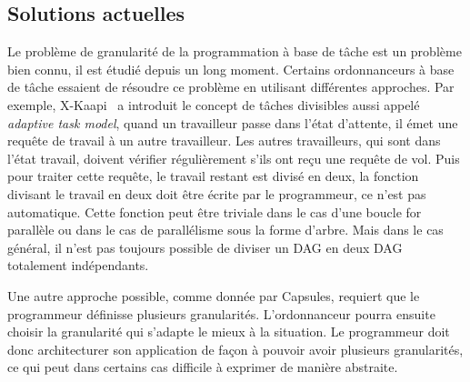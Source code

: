 \subsection{Solutions actuelles}
Le problème de granularité de la programmation à base de tâche est un problème bien connu, il est étudié depuis un long moment.
%
Certains ordonnanceurs à base de tâche essaient de résoudre ce problème en utilisant différentes approches.
%
Par exemple, X-Kaapi~\cite{xkaapi} a introduit le concept de tâches divisibles aussi appelé {\em adaptive task model}, quand un travailleur passe dans l'état d'attente, il émet une requête de travail à un autre travailleur.
%
Les autres travailleurs, qui sont dans l'état travail, doivent vérifier régulièrement s'ils ont reçu une requête de vol.
%
Puis pour traiter cette requête, le travail restant est divisé en deux, la fonction divisant le travail en deux doit être écrite par le programmeur, ce n'est pas automatique.
%
Cette fonction peut être triviale dans le cas d'une boucle for parallèle ou dans le cas de parallélisme sous la forme d'arbre.
%
Mais dans le cas général, il n'est pas toujours possible de diviser un DAG en deux DAG totalement indépendants.


Une autre approche possible, comme donnée par Capsules\cite{capsules}, requiert que le programmeur définisse plusieurs granularités.
%
L'ordonnanceur pourra ensuite choisir la granularité qui s'adapte le mieux à la situation.
%
Le programmeur doit donc architecturer son application de façon à pouvoir avoir plusieurs granularités, ce qui peut dans certains cas difficile à exprimer de manière abstraite.
